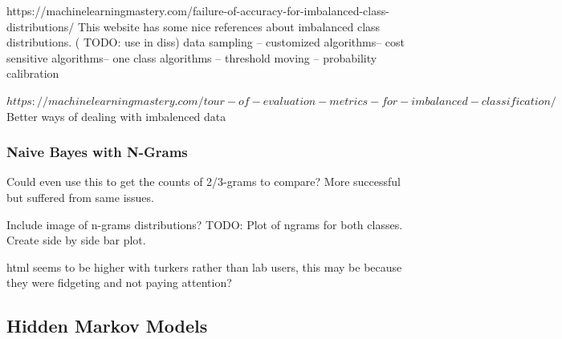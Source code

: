 \documentclass{article}
\begin{document}
https://machinelearningmastery.com/failure-of-accuracy-for-imbalanced-class-distributions/
This website has some nice references about imbalanced class distributions.
( TODO: use in diss)
data sampling – customized algorithms– cost sensitive algorithms– one class algorithms – threshold moving – probability calibration


$https://machinelearningmastery.com/tour-of-evaluation-metrics-for-imbalanced-classification/$
Better ways of dealing with imbalenced data

\subsubsection{Naive Bayes with N-Grams}
Could even use this to get the counts of 2/3-grams to compare?
More successful but suffered from same issues.

Include image of n-grams distributions?
TODO: Plot of ngrams for both classes. Create side by side bar plot.

html seems to be higher with turkers rather than lab users, this may be because they were fidgeting and not paying attention?

\subsection{Hidden Markov Models}

\end{document}
